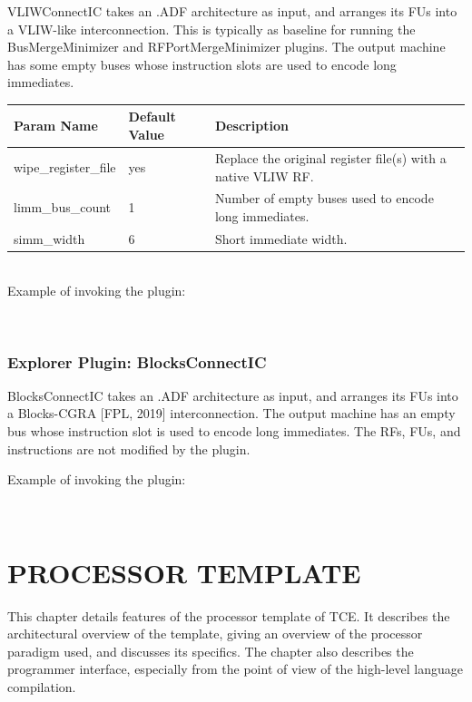 \documentclass[a4paper,twoside]{tceusermanual}
\begin{document}
VLIWConnectIC takes an .ADF architecture as input, and arranges its FUs into a
VLIW-like interconnection. This is typically as baseline for running the
BusMergeMinimizer and RFPortMergeMinimizer plugins. The output machine has some
empty buses whose instruction slots are used to encode long immediates.

\begin{tabular}{p{}p{}
                p{}}
\textbf{Param Name} &\textbf{Default Value} &\textbf{Description} \\
\hline
wipe\_register\_file & yes & Replace the original register file(s) with a native VLIW RF. \\
limm\_bus\_count & 1 & Number of empty buses used to encode long immediates. \\
simm\_width & 6 & Short immediate width. \\
\end{tabular}\\

Example of invoking the plugin:

\\

\subsection{Explorer Plugin: BlocksConnectIC}

BlocksConnectIC takes an .ADF architecture as input, and arranges its FUs into a
Blocks-CGRA [FPL, 2019] interconnection. The output machine has an empty bus whose
instruction slot is used to encode long immediates. The RFs, FUs, and instructions
are not modified by the plugin.

Example of invoking the plugin:

\\

\chapter{PROCESSOR TEMPLATE}
\label{section:template}

This chapter details features of the processor template of TCE.
It describes the architectural overview of the template, giving 
an overview of the processor paradigm used, and discusses
its specifics. The chapter also describes the programmer interface, 
especially from the point of view of the high-level language 
compilation.
\end{document}
